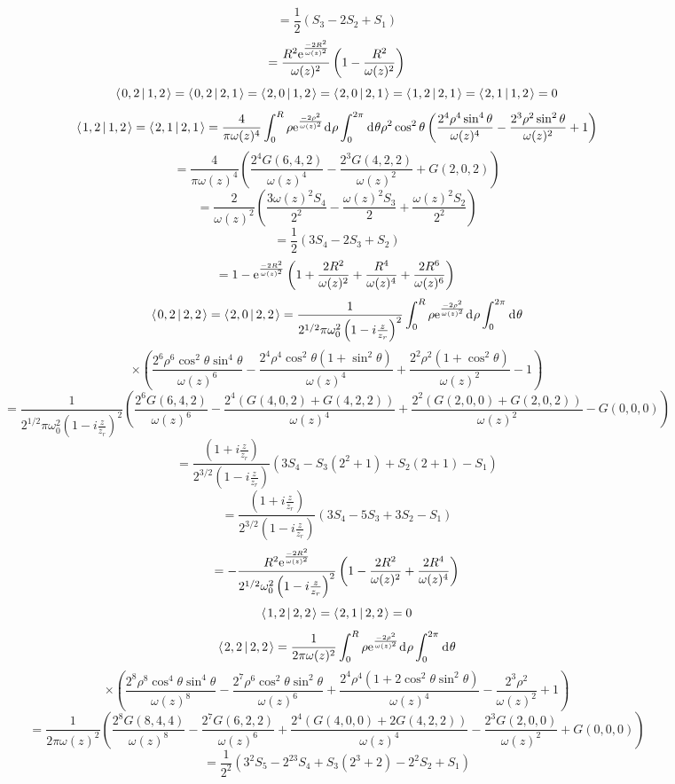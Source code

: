 \documentclass[11pt]{amsart}
\makeatletter
\newcommand{\e}{{\rm e}}				%
\newcommand{\msp}[1]{\mspace{#1mu}}		%
\newcommand{\0}{\varnothing}		%
\newcommand{\dd}{\msp{1} {\rm{d}} \msp{1}}	%
\newcommand{\brac}[2]{\left\langle\msp{2} #1\left\lvert \msp{3.5} #2 \right.\right\rangle}	%
\newcommand{\1}{!}
\newcommand{\2}{@}
\newcommand{\3}{\#}
\newcommand{\4}{\$}
\newcommand{\5}{\%}
\newcommand{\6}{$^\wedge$}
\newcommand{\7}{\&}
\newcommand{\8}{*}
\newcommand{\9}{(}
\makeatother
\begin{document}
\[
=\frac{1}{2}\left(S_3-2S_2+S_1\right)
\]
\[
=\frac{R^2\e^{\frac{-2R^2}{\omega(z)^2}}}{\omega(z)^2}\left(1-\frac{R^2}{\omega(z)^2}\right)
\]
\[
\brac{0,2}{1,2} = \brac{0,2}{2,1} = \brac{2,0}{1,2} = \brac{2,0}{2,1} = \brac{1,2}{2,1} = \brac{2,1}{1,2} = 0
\]
\[
\brac{1,2}{1,2} = \brac{2,1}{2,1} = \frac{4}{\pi \omega(z)^4}\int_0^R \rho \e^{\frac{-2\rho^2}{\omega(z)^2}}\dd \rho\int_0^{2\pi}\dd \theta \rho^2\cos^2\theta\left(\frac{2^4\rho^4\sin^4\theta}{\omega(z)^4}-\frac{2^3\rho^2\sin^2\theta}{\omega(z)^2}+1\right)
\]
\[
=\frac{4}{\pi\omega(z)^4}\left(\frac{2^4G(6,4,2)}{\omega(z)^4}-\frac{2^3G(4,2,2)}{\omega(z)^2}+G(2,0,2)\right)
\]
\[
=\frac{2}{ \omega(z)^2}\left(\frac{3\omega(z)^2S_4}{2^2}-\frac{\omega(z)^2S_3}{2}+\frac{\omega(z)^2S_2}{2^2}\right)
\]
\[
=\frac{1}{2}\left(3S_4-2S_3+S_2\right)
\]
\[
=1-\e^{\frac{-2R^2}{\omega(z)^2}}\left(1+\frac{2R^2}{\omega(z)^2}+\frac{R^4}{\omega(z)^4}+\frac{2R^6}{\omega(z)^6}\right)
\]
\[
\brac{0,2}{2,2} = \brac{2,0}{2,2} = \frac{1}{2^{1/2}\pi\omega_0^2\left(1-i\frac{z}{z_r}\right)^2}\int_0^R \rho \e^{\frac{-2\rho^2}{\omega(z)^2}}\dd \rho\int_0^{2\pi} \dd \theta
\]
\[
\times\left(\frac{2^6\rho^6\cos^2\theta\sin^4\theta}{\omega(z)^6}-\frac{2^4\rho^4\cos^2\theta\left(1+\sin^2\theta\right)}{\omega(z)^4}+\frac{2^2\rho^2\left(1+\cos^2\theta\right)}{\omega(z)^2}-1\right)
\]
\[
=\frac{1}{2^{1/2}\pi \omega_0^2\left(1-i\frac{z}{z_r}\right)^2}\left(\frac{2^6G(6,4,2)}{\omega(z)^6}-\frac{2^4\left(G(4,0,2)+G(4,2,2)\right)}{\omega(z)^4}+\frac{2^2\left(G(2,0,0)+G(2,0,2)\right)}{\omega(z)^2}-G(0,0,0)\right)
\]
\[
=\frac{\left(1+i\frac{z}{z_r}\right)}{2^{3/2}\left(1-i\frac{z}{z_r}\right)}\left(3S_4-S_3\left(2^2+1\right)+S_2\left(2+1\right)-S_1\right)
\]
\[
=\frac{\left(1+i\frac{z}{z_r}\right)}{2^{3/2}\left(1-i\frac{z}{z_r}\right)}\left(3S_4-5S_3+3S_2-S_1\right)
\]
\[
=-\frac{R^2\e^{\frac{-2R^2}{\omega(z)^2}}}{2^{1/2}\omega_0^2\left(1-i\frac{z}{z_r}\right)^2}\left(1-\frac{2R^2}{\omega(z)^2}+\frac{2R^4}{\omega(z)^4}\right)
\]
\[
\brac{1,2}{2,2} = \brac{2,1}{2,2} = 0
\]
\[
\brac{2,2}{2,2} = \frac{1}{2\pi\omega(z)^2}\int_0^R \rho \e^{\frac{-2\rho^2}{\omega(z)^2}}\dd \rho \int_0^{2\pi}\dd \theta
\]
\[
\times\left(\frac{2^8\rho^8\cos^4\theta\sin^4\theta}{\omega(z)^8}-\frac{2^7\rho^6\cos^2\theta\sin^2\theta}{\omega(z)^6}+\frac{2^4\rho^4\left(1+2\cos^2\theta\sin^2\theta\right)}{\omega(z)^4}-\frac{2^3\rho^2}{\omega(z)^2}+1\right)
\]
\[
=\frac{1}{2\pi\omega(z)^2}\left(\frac{2^8G(8,4,4)}{\omega(z)^8}-\frac{2^7G(6,2,2)}{\omega(z)^6}+\frac{2^4\left(G(4,0,0)+2G(4,2,2)\right)}{\omega(z)^4}-\frac{2^3G(2,0,0)}{\omega(z)^2}+G(0,0,0)\right)
\]
\[
=\frac{1}{2^2}\left(3^2S_5-2^23S_4+S_3\left(2^3+2\right)-2^2S_2+S_1\right)
\]
\end{document}
